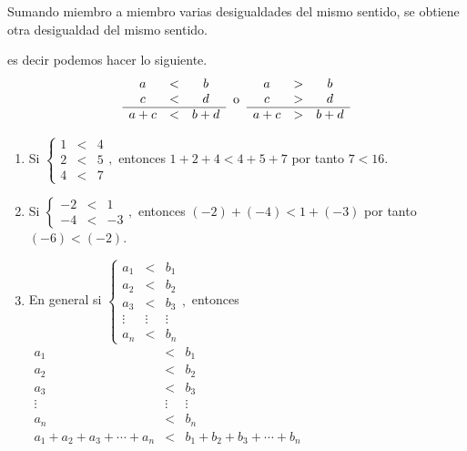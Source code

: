 \documentclass[oneside,english,spanish,2m,twoside,svgnames,x11names,HTML,twoside,12pt]{libro-matua}\usepackage[]{graphicx}\usepackage[]{color}
\begin{document}
\begin{propiedad}{}

Sumando miembro a miembro varias desigualdades del mismo sentido,
se obtiene otra desigualdad del mismo sentido.

\end{propiedad}

es decir podemos hacer lo siguiente. 
\[
\begin{array}{ccc}
a & < & b\\
c & < & d\\
\hline a+c & < & b+d
\end{array}\;\;\text{o\;\;\ensuremath{\begin{array}{ccc}
 \text{\text{\ensuremath{a}}}  &  >  &  \text{\ensuremath{b}}\\
 \text{\ensuremath{c}}  &  >  &  \text{\ensuremath{d}}\\
\hline \text{\ensuremath{a+c}}  &  >  &  \text{\ensuremath{b+d}} 
\end{array}}}
\]
\begin{ejemplos}
\begin{enumerate}
\item Si $\left\{ \begin{array}{ccc}
1 & < & 4\\
2 & < & 5\\
4 & < & 7
\end{array}\right.,$ entonces $1+2+4<4+5+7$ por tanto $7<16.$
\item Si $\left\{ \begin{array}{ccc}
-2 & < & 1\\
-4 & < & -3
\end{array}\right.,$ entonces $\left(-2\right)+\left(-4\right)<1+\left(-3\right)$ por
tanto $\left(-6\right)<\left(-2\right).$
\item En general si $\left\{ \begin{array}{ccc}
a_{1} & < & b_{1}\\
a_{2} & < & b_{2}\\
a_{3} & < & b_{3}\\
\vdots & \vdots & \vdots\\
a_{n} & < & b_{n}
\end{array}\right.,$ entonces \foreignlanguage{english}{$\begin{array}{ccc}
a_{1} & < & b_{1}\\
a_{2} & < & b_{2}\\
a_{3} & < & b_{3}\\
\vdots & \vdots & \vdots\\
a_{n} & < & b_{n}\\
\hline a_{1}+a_{2}+a_{3}+\cdots+a_{n} & < & b_{1}+b_{2}+b_{3}+\cdots+b_{n}
\end{array}\;$}
\end{enumerate}
\end{ejemplos}
\end{document}
